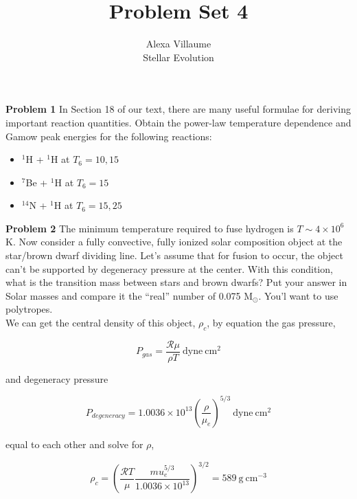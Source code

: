 \documentclass[12pt]{article}
\begin{document}
 
 \title{Problem Set 4}
\author{Alexa Villaume\\ 
Stellar Evolution } 
 
\maketitle
 
\noindent \textbf{Problem 1} In Section 18 of our text, there are many useful formulae for deriving important reaction quantities. Obtain the power-law temperature dependence and Gamow peak energies for the following reactions:\\

\begin{itemize}
\item $^{1}$H + $^{1}$H at $T_6 = 10, 15$
\item $^{7}$Be + $^{1}$H at $T_6 = 15$
\item $^{14}$N +  $^{1}$H at $T_6 = 15, 25$
\end{itemize}
 
\noindent \textbf{Problem 2} The minimum temperature required to fuse hydrogen is $T\sim4 \times 10^6$ K. Now consider a fully convective, fully ionized solar composition object at the star/brown dwarf dividing line. Let's assume that for fusion to occur, the object can't be supported by degeneracy pressure at the center. With this condition, what is the transition mass between stars and brown dwarfs? Put your answer in Solar masses and compare it the ``real'' number of 0.075 M$_{\odot}$. You'l want to use polytropes.\\
 
 \noindent We can get the central density of this object, $\rho_c$, by equation the gas pressure,
 
 \begin{equation}
 P_{gas} = \frac{\mathcal{R}{\mu}}{\rho T} \mathrm{~dyne~cm^2}
 \end{equation}
 
and degeneracy pressure

\begin{equation}
P_{degeneracy} = 1.0036 \times 10^{13} \left( \frac{\rho}{\mu_e}\right)^{5/3} \mathrm{~dyne~cm^2}
\end{equation}

\noindent equal to each other and solve for $\rho$, 
 
 \begin{equation}
 \rho_c = \left( \frac{\mathcal{R}T}{\mu}\frac{mu_e^{5/3}}{1.0036 \times 10^{13}}\right)^{3/2} = 589 \mathrm{~g  ~cm^{-3}}
 \end{equation}
 
\end{document}
